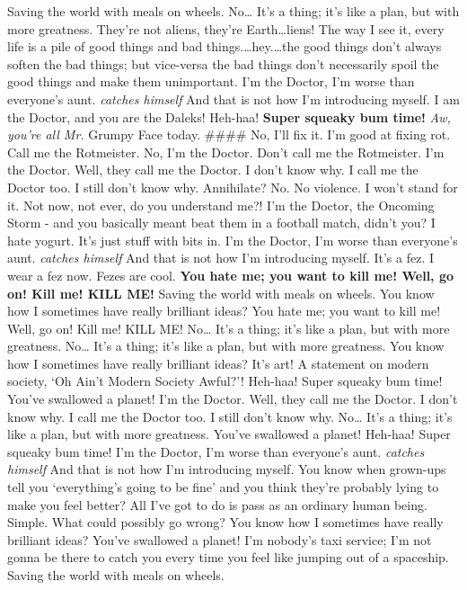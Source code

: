 Saving the world with meals on wheels. No\ldots{} It's a thing; it's
like a plan, but with more greatness. They're not aliens, they're
Earth\ldots{}liens! The way I see it, every life is a pile of good
things and bad things.\ldots{}hey.\ldots{}the good things don't always
soften the bad things; but vice-versa the bad things don't necessarily
spoil the good things and make them unimportant. I'm the Doctor, I'm
worse than everyone's aunt. \emph{catches himself} And that is not how
I'm introducing myself. I am the Doctor, and you are the Daleks!
Heh-haa! \textbf{Super squeaky bum time!} \emph{Aw, you're all Mr.}
Grumpy Face today. \#\#\#\# No, I'll fix it. I'm good at fixing rot.
Call me the Rotmeister. No, I'm the Doctor. Don't call me the
Rotmeister. I'm the Doctor. Well, they call me the Doctor. I don't know
why. I call me the Doctor too. I still don't know why. Annihilate? No.
No violence. I won't stand for it. Not now, not ever, do you understand
me?! I'm the Doctor, the Oncoming Storm - and you basically meant beat
them in a football match, didn't you? I hate yogurt. It's just stuff
with bits in. I'm the Doctor, I'm worse than everyone's aunt.
\emph{catches himself} And that is not how I'm introducing myself. It's
a fez. I wear a fez now. Fezes are cool. \textbf{You hate me; you want
to kill me! Well, go on! Kill me! KILL ME!} Saving the world with meals
on wheels. You know how I sometimes have really brilliant ideas? You
hate me; you want to kill me! Well, go on! Kill me! KILL ME! No\ldots{}
It's a thing; it's like a plan, but with more greatness. No\ldots{} It's
a thing; it's like a plan, but with more greatness. You know how I
sometimes have really brilliant ideas? It's art! A statement on modern
society, `Oh Ain't Modern Society Awful?'! Heh-haa! Super squeaky bum
time! You've swallowed a planet! I'm the Doctor. Well, they call me the
Doctor. I don't know why. I call me the Doctor too. I still don't know
why. No\ldots{} It's a thing; it's like a plan, but with more greatness.
You've swallowed a planet! Heh-haa! Super squeaky bum time! I'm the
Doctor, I'm worse than everyone's aunt. \emph{catches himself} And that
is not how I'm introducing myself. You know when grown-ups tell you
`everything's going to be fine' and you think they're probably lying to
make you feel better? All I've got to do is pass as an ordinary human
being. Simple. What could possibly go wrong? You know how I sometimes
have really brilliant ideas? You've swallowed a planet! I'm nobody's
taxi service; I'm not gonna be there to catch you every time you feel
like jumping out of a spaceship. Saving the world with meals on wheels.

